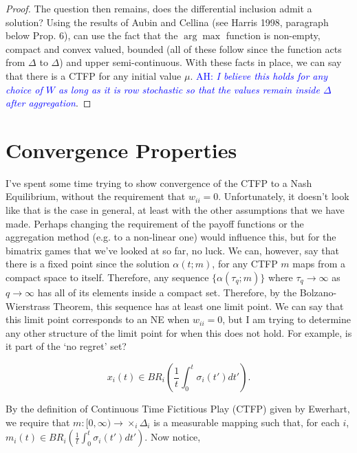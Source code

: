 \documentclass{article}
\theoremstyle{definition}
\newcommand{\ah}[1]{\textcolor{blue}{AH: \textit{#1}}}
\begin{document}
\begin{proof}
		The question then remains, does the differential inclusion admit a solution? Using the
		results of Aubin and Cellina (see Harris 1998, paragraph below Prop. 6), can use the fact
		that the $\arg \max$ function is non-empty, compact and convex valued, bounded (all of
		these follow since the function acts from $\Delta$ to $\Delta$) and upper semi-continuous.
		With these facts in place, we can say that there is a CTFP for any initial value $\mu$.
		\ah{I believe this holds for any choice of $W$ as long as it is row stochastic so that
		the values remain inside $\Delta$ after aggregation}.
	\end{proof}
	
	\newpage
	
	\section*{Convergence Properties}

	I've spent some time trying to show convergence of the CTFP to a Nash Equilibrium, without the
	requirement that $w_{ii} = 0$. Unfortunately, it doesn't look like that is the case in general,
	at least with the other assumptions that we have made. Perhaps changing the requirement of the
	payoff functions or the aggregation method (e.g. to a non-linear one) would influence this, but
	for the bimatrix games that we've looked at so far, no luck.
	We can, however, say that there is a fixed point since the solution $\alpha(t; m)$, for any CTFP
	$m$ maps from a compact space to itself. Therefore, any sequence $\{\alpha(\tau_q; m)\}$ where
	$\tau_q \rightarrow \infty$ as $q \rightarrow \infty$ has all of its elements inside a compact
	set. Therefore, by the Bolzano-Wierstrass Theorem, this sequence has at least one limit point.
	We can say that this limit point corresponds to an NE when $w_{ii} = 0$, but I am trying to
	determine any other structure of the limit point for when this does not hold. For example, is it
	part of the `no regret' set?

	\newpage

	\begin{equation}
		x_i(t) \in BR_i \left( \frac{1}{t} \int_{0}^{t} \sigma_i(t') dt' \right).
	\end{equation}
	
	By the definition of Continuous Time Fictitious Play (CTFP) given by Ewerhart, we require that $m: [0, \infty) \rightarrow \times_i \Delta_i$ is a measurable mapping such that, for each $i$, $m_i(t) \in BR_i \left( \frac{1}{t} \int_{0}^{t} \sigma_i(t') dt' \right)$. Now notice,
	
\end{document}
